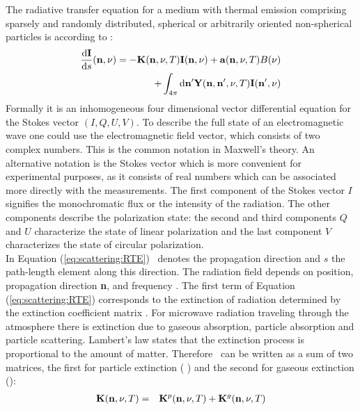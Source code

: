 \newcommand{\DirFre} {(\PDir, \Frq, \Tmp)} \newcommand{\DirFrePr}
{\ensuremath{(\PDir, \PDir^\prime, \Frq, \Tmp)}}


\label{sec:scattering:general_rte}
 
The radiative transfer equation for a medium with thermal emission
comprising sparsely and randomly distributed, spherical or arbitrarily
oriented non-spherical particles is according to \cite{sree02}:
\begin{eqnarray}
\label{eq:scattering:RTE} 
     \frac{\DiffD \StoVec}{\DiffD s}(\PDir, \Frq) =
     -\ExtMat\DirFre\StoVec(\PDir, \Frq)+\AbsVec\DirFre
     \Planck(\Frq) \\ \nonumber
     +\int_{4\pi} \DiffD \PDir^\prime \SEfMat\DirFrePr
     \StoVec(\PDir^\prime, \Frq) 
\end{eqnarray} 
Formally it is an inhomogeneous four dimensional vector differential
equation for the Stokes vector \StoVec $(I,Q,U,V)$. To describe the
full state of an electromagnetic wave one could use the
electromagnetic field vector, which consists of two complex numbers.
This is the common notation in Maxwell's theory. An alternative
notation is the Stokes vector which is more convenient for
experimental purposes, as it consists of real numbers which can be
associated more directly with the measurements.  The first component
of the Stokes vector $I$ signifies the monochromatic flux or the
intensity of the radiation. The other components describe the
polarization state: the second and third components $Q$ and $U$
characterize the state of linear polarization and the last component
$V$
characterizes the state of circular polarization.\\
In Equation (\ref{eq:scattering:RTE}) \PDir\ denotes the propagation
direction and \DiffD $s$ the path-length element along this direction.
The radiation field depends on position, propagation direction {\bf
  n}, and frequency \Frq.  \vspace{1ex} The first term of Equation
(\ref{eq:scattering:RTE}) corresponds to the extinction of radiation
determined by the extinction coefficient matrix \ExtMat . For
microwave radiation traveling through the atmosphere there is
extinction due to gaseous absorption, particle absorption and particle
scattering. Lambert's law states that the extinction process is
proportional to the amount of matter. Therefore \ExtMat\ can be
written as a sum of two matrices, the first for particle extinction (
) and the second for gaseous extinction ():
\begin{eqnarray}
  \ExtMat\DirFre &=&
  \aExtMat{p}\DirFre+\aExtMat{g}\DirFre
\end{eqnarray}

